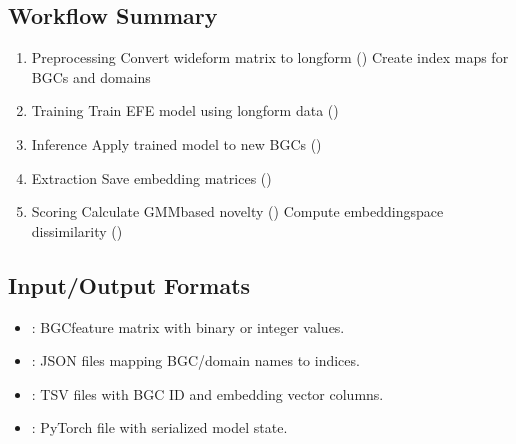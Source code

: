 \documentclass[letterpaper,10pt,english]{sphinxmanual}
\begin{document}
\subsection{Workflow Summary}
\label{\detokenize{efe-bgc_technical_spec:workflow-summary}}\begin{enumerate}
%
\item {} 
\sphinxAtStartPar
Preprocessing
\sphinxhyphen{} Convert wide\sphinxhyphen{}form matrix to long\sphinxhyphen{}form ()
\sphinxhyphen{} Create index maps for BGCs and domains

\item {} 
\sphinxAtStartPar
Training
\sphinxhyphen{} Train EFE model using long\sphinxhyphen{}form data ()

\item {} 
\sphinxAtStartPar
Inference
\sphinxhyphen{} Apply trained model to new BGCs ()

\item {} 
\sphinxAtStartPar
Extraction
\sphinxhyphen{} Save embedding matrices ()

\item {} 
\sphinxAtStartPar
Scoring
\sphinxhyphen{} Calculate GMM\sphinxhyphen{}based novelty ()
\sphinxhyphen{} Compute embedding\sphinxhyphen{}space dissimilarity ()

\end{enumerate}


\subsection{Input/Output Formats}
\label{\detokenize{efe-bgc_technical_spec:input-output-formats}}\begin{itemize}
\item {} 
\sphinxAtStartPar
{}: BGC\sphinxhyphen{}feature matrix with binary or integer values.

\item {} 
\sphinxAtStartPar
{}: JSON files mapping BGC/domain names to indices.

\item {} 
\sphinxAtStartPar
{}: TSV files with BGC ID and embedding vector columns.

\item {} 
\sphinxAtStartPar
{}: PyTorch  file with serialized model state.

\end{itemize}



\renewcommand{\indexname}{Index}
\printindex
\end{document}
